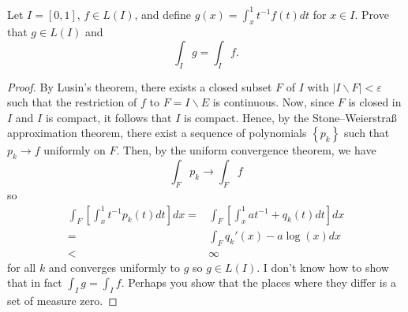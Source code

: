 \begin{problem}
Let $I=[0,1]$, $f\in L(I)$, and define $g(x)=\int_x^1
t^{-1}f(t) d  t$ for $x\in I$. Prove that $g\in L(I)$ and
\[
\int_I g=\int_I f.
\]
\end{problem}
\begin{proof}
By Lusin's theorem, there exists a closed subset $F$ of $I$ with $|I\smallsetminus
F|<\varepsilon$ such that the restriction of $f$ to $F= I\smallsetminus E$
is continuous. Now, since $F$ is closed in $I$ and $I$ is compact, it
follows that $I$ is compact. Hence, by the Stone--Weierstraß approximation
theorem, there exist a sequence of polynomials $\left\{ p_k \right\}$ such
that $p_k\to f$ uniformly on $F$. Then, by the uniform convergence theorem,
we have
\begin{equation}
  \label{eq:uniform-convergence-2-4}
\int_F p_k\longrightarrow \int_F f
\end{equation}
so
\begin{equation}
  \label{eq:uniform-convergence-2-2-4}
\begin{aligned}
\int_F\left[\int_x^1t^{-1}p_k(t) d  t\right] d  x
={}&\int_F\left[\int_x^1 at^{-1}+q_k(t) d  t\right] d  x\\
={}&\int_F q_k'(x)-a\log(x) d  x\\
<{}&\infty
\end{aligned}
\end{equation}
for all $k$ and converges uniformly to $g$ so $g\in L(I)$. I don't know
how to show that in fact $\int_I g=\int_I f$. Perhaps you show that the
places where they differ is a set of measure zero.
\end{proof}


